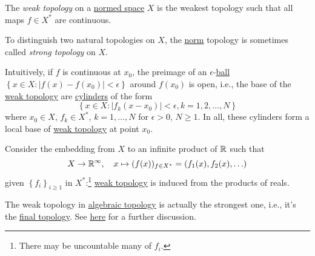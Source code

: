 \begin{definition}\label{def:weak-topology}
	The \emph{weak topology} on a \hyperref[def:normed-vector-space]{normed space} \(X\) is the weakest topology such that all maps \(f\in X^{\ast} \) are continuous.
\end{definition}

\begin{note}\label{note:strong-topology}
	To distinguish two natural topologies on \(X\), the \hyperref[def:norm]{norm} topology is sometimes called \emph{strong topology} on \(X\).
\end{note}

Intuitively, if \(f\) is continuous at \(x_0\), the preimage of an \(\epsilon \)-\hyperref[def:ball]{ball} \(\left\{ x\in X\colon \left\vert f(x) - f(x_0) \right\vert < \epsilon  \right\}\) around \(f(x_0)\) is open, i.e., the base of the \hyperref[def:weak-topology]{weak topology} are \href{https://en.wikipedia.org/wiki/Cylinder_set}{cylinders} of the form
\[
	\left\{ x\in X\colon \left\vert f_k(x - x_0) \right\vert < \epsilon , k = 1, 2, \ldots , N \right\}
\]
where \(x_0\in X\), \(f_k\in X^{\ast} \), \(k = 1, \ldots  , N\) for \(\epsilon > 0\), \(N \geq 1\). In all, these cylinders form a local base of \hyperref[def:weak-topology]{weak topology} at point \(x_0\).

\begin{remark}
	Consider the embedding from \(X\) to an infinite product of \(\mathbb{\MakeUppercase{r}} \) such that
	\[
		X\to \mathbb{\MakeUppercase{r}} ^{\infty} ,
		\quad x\mapsto (f(x))_{f\in X^{\ast}} = (f_1(x), f_2(x), \ldots )
	\]
	given \(\left\{ f_i \right\} _{i \geq 1}\) in \(X^{\ast}\):\footnote{There may be uncountable many of \(f_i\).} \hyperref[def:weak-topology]{weak topology} is induced from the products of reals.
\end{remark}

\begin{note}
	The weak topology in \href{https://www.pbb.wtf/posts/Notes#algebraic-topology-math592-umich}{algebraic topology} is actually the strongest one, i.e., it's the \href{https://en.wikipedia.org/wiki/Final_topology}{final topology}. See \href{https://math.stackexchange.com/questions/921744/any-relations-between-the-weak-topology-on-a-banach-space-and-the-weak-topology}{here} for a further discussion.
\end{note}

